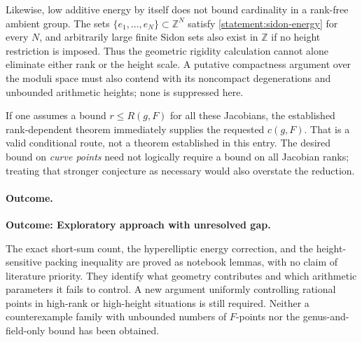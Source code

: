 \documentclass[11pt,a4paper]{article}
\newcommand{\Z}{\mathbb{Z}}
\numberwithin{equation}{section}
\begin{document}
Likewise, low additive energy by itself does not bound cardinality in a
rank-free ambient group. The sets $\{e_1,\ldots,e_N\}\subset\Z^N$ satisfy
\eqref{statement:sidon-energy} for every $N$, and arbitrarily large finite
Sidon sets also exist in $\Z$ if no height restriction is imposed. Thus
the geometric rigidity calculation cannot alone eliminate either rank
or the height scale. A putative compactness argument over the moduli
space must also contend with its noncompact degenerations and unbounded
arithmetic heights; none is suppressed here.

If one assumes a bound $r\le R(g,F)$ for all these Jacobians, the
established rank-dependent theorem immediately supplies the requested
$c(g,F)$. That is a valid conditional route, not a theorem established
in this entry. The desired bound on \emph{curve points} need not logically
require a bound on all Jacobian ranks; treating that stronger conjecture
as necessary would also overstate the reduction.

\paragraph{Outcome.}
\textbf{Outcome: Exploratory approach with unresolved gap.}

The exact short-sum count, the hyperelliptic energy correction, and the
height-sensitive packing inequality are proved as notebook lemmas, with
no claim of literature priority. They identify what geometry contributes
and which arithmetic parameters it fails to control. A new argument
uniformly controlling rational points in high-rank or high-height
situations is still required. Neither a counterexample family with
unbounded numbers of $F$-points nor the genus-and-field-only bound has
been obtained.

\end{document}
